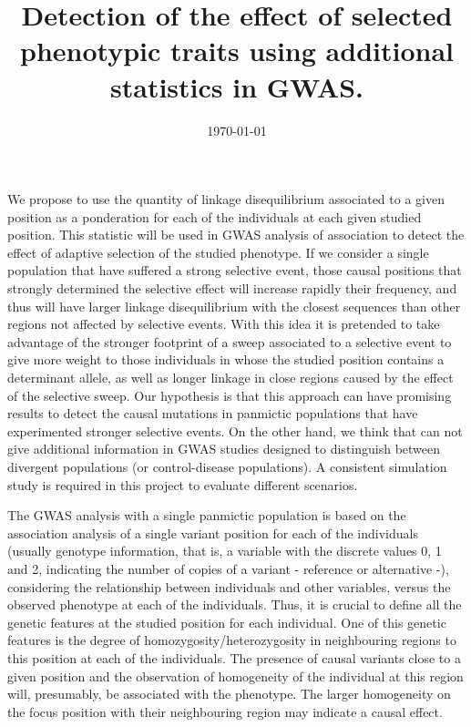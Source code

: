 \documentclass[a4paper,11pt]{article}
\begin{document}
\title{Detection of the effect of selected phenotypic traits using additional statistics in GWAS.}
\date{\today}
\maketitle

We propose to use the quantity of linkage disequilibrium associated to a given position as a ponderation for each of the individuals at each given studied position. This statistic will be used in GWAS analysis of association to detect the effect of adaptive selection of the studied phenotype. If we consider a single population that have suffered a strong selective event, those causal positions that strongly determined the selective effect will increase rapidly their frequency, and thus will have larger linkage disequilibrium with the closest sequences than other regions not affected by selective events.  With this idea it is pretended to take advantage of the stronger footprint of a sweep associated to a selective event  to give more weight to those individuals in whose the studied position contains a determinant allele, as well as longer linkage in close regions caused by the effect of the selective sweep. Our hypothesis is that this approach can have  promising results to detect the causal mutations in panmictic populations that have experimented stronger selective events. On the other hand, we think that can not give additional information in GWAS studies designed to distinguish between divergent populations (or control-disease populations). A consistent simulation study is required in this project to evaluate different scenarios.

The GWAS analysis with a single panmictic population is based on the association analysis of a single variant position for each of the individuals (usually genotype information, that is, a variable with  the discrete values 0, 1 and 2, indicating the number of copies of a variant - reference or alternative -), considering the relationship between individuals and other variables, versus the observed phenotype at each of the individuals. Thus, it is crucial to define all the genetic features at the studied position for each individual. One of this genetic features is the degree of homozygosity/heterozygosity in neighbouring regions to this position at each of the individuals. The presence of causal variants close to a given position and the observation of homogeneity of the individual at this region will, presumably, be associated with the phenotype. The larger homogeneity on the focus position with their neighbouring region may indicate a causal effect.
\end{document}
